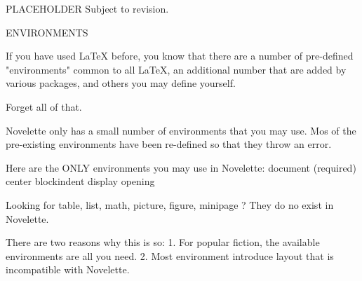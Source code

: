 
PLACEHOLDER
Subject to revision.


ENVIRONMENTS

If you have used LaTeX before, you know that there are a number of pre-defined
"environments" common to all LaTeX, an additional number that are added by
various packages, and others you may define yourself.

Forget all of that.

Novelette only has a small number of environments that you may use.
Mos of the pre-existing environments have been re-defined so that they throw
an error.

Here are the ONLY environments you may use in Novelette:
	document (required)
	center
	blockindent
	display
	opening

Looking for table, list, math, picture, figure, minipage ?
They do no exist in Novelette.

There are two reasons why this is so:
	1. For popular fiction, the available environments are all you need.
	2. Most environment introduce layout that is incompatible with Novelette.



